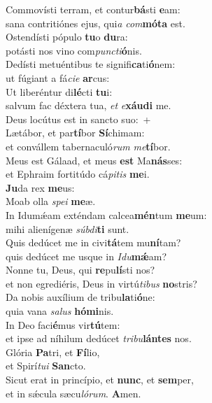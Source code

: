 \evenverse Commovísti terram, et contur\textbf{bá}sti \textbf{e}am:~\*\\
\evenverse sana contritiónes ejus, qui\textit{a} \textit{com}\textbf{mó}\textbf{ta} est.\\
\oddverse Ostendísti pópulo \textbf{tu}o \textbf{du}ra:~\*\\
\oddverse potásti nos vino com\textit{pun}\textit{cti}\textbf{ó}nis.\\
\evenverse Dedísti metuéntibus te signifi\textbf{ca}ti\textbf{ó}nem:~\*\\
\evenverse ut fúgiant a fá\textit{ci}\textit{e} \textbf{ar}cus:\\
\oddverse Ut liberéntur di\textbf{lé}cti \textbf{tu}i:~\*\\
\oddverse salvum fac déxtera tua, \textit{et} \textit{e}\textbf{xáu}\textbf{di} me.\\
\evenverse Deus locútus est in sancto suo:~+\\
\evenverse  Lætábor, et par\textbf{tí}bor \textbf{Sí}chimam:~\*\\
\evenverse et convállem tabernaculó\textit{rum} \textit{me}\textbf{tí}bor.\\
\oddverse Meus est Gálaad, et meus \textbf{est} Ma\textbf{nás}ses:~\*\\
\oddverse et Ephraim fortitúdo cá\textit{pi}\textit{tis} \textbf{me}i.\\
\evenverse \textbf{Ju}da rex \textbf{me}us:~\*\\
\evenverse Moab olla \textit{spe}\textit{i} \textbf{me}æ.\\
\oddverse In Idumǽam exténdam calcea\textbf{mén}tum \textbf{me}um:~\*\\
\oddverse mihi alienígenæ \textit{súb}\textit{di}\textbf{ti} sunt.\\
\evenverse Quis dedúcet me in civi\textbf{tá}tem mu\textbf{ní}tam?~\*\\
\evenverse quis dedúcet me usque in \textit{I}\textit{du}\textbf{mǽ}am?\\
\oddverse Nonne tu, Deus, qui \textbf{re}pu\textbf{lí}sti nos?~\*\\
\oddverse et non egrediéris, Deus in virtú\textit{ti}\textit{bus} \textbf{no}stris?\\
\evenverse Da nobis auxílium de tribu\textbf{la}ti\textbf{ó}ne:~\*\\
\evenverse quia vana \textit{sa}\textit{lus} \textbf{hó}\textbf{mi}nis.\\
\oddverse In Deo faci\textbf{é}mus vir\textbf{tú}tem:~\*\\
\oddverse et ipse ad níhilum dedúcet \textit{tri}\textit{bu}\textbf{lán}\textbf{tes} nos.\\
\evenverse Glória \textbf{Pa}tri, et \textbf{Fí}lio,~\*\\
\evenverse et Spirí\textit{tu}\textit{i} \textbf{San}cto.\\
\oddverse Sicut erat in princípio, et \textbf{nunc}, et \textbf{sem}per,~\*\\
\oddverse et in sǽcula sæcu\textit{ló}\textit{rum}. \textbf{A}men.\\
